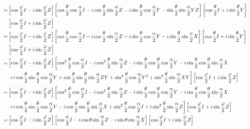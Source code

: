 \documentclass[en]{sol-man}
\begin{document}
\begin{pf}
\begin{align}
        \notag=&\left[\cos\frac{\varphi}{2}I-i\sin\frac{\varphi}{2}Z\right]\left[\cos\frac{\theta}{2}\cos\frac{\alpha}{2}I-i\cos\frac{\theta}{2}\sin\frac{\alpha}{2}Z-i\sin\frac{\theta}{2}\cos\frac{\alpha}{2}Y-\sin\frac{\theta}{2}\sin\frac{\alpha}{2}YZ\right]\left[\cos\frac{\theta}{2}I+i\sin\frac{\theta}{2}Y\right]\\
        \notag&\left[\cos\frac{\varphi}{2}I+i\sin\frac{\varphi}{2}Z\right]\\
        \notag=&\left[\cos\frac{\varphi}{2}I-i\sin\frac{\varphi}{2}Z\right]\left[\cos\frac{\theta}{2}\cos\frac{\alpha}{2}I-i\cos\frac{\theta}{2}\sin\frac{\alpha}{2}Z-i\sin\frac{\theta}{2}\cos\frac{\alpha}{2}Y-i\sin\frac{\theta}{2}\sin\frac{\alpha}{2}X\right]\left[\cos\frac{\theta}{2}I+i\sin\frac{\theta}{2}Y\right]\\
        \notag&\left[\cos\frac{\varphi}{2}I+i\sin\frac{\varphi}{2}Z\right]\\
        \notag=&\left[\cos\frac{\varphi}{2}I-i\sin\frac{\varphi}{2}Z\right]\left[\cos^2\frac{\theta}{2}\cos\frac{\alpha}{2}I-i\cos^2\frac{\theta}{2}\sin\frac{\alpha}{2}Z-i\sin\frac{\theta}{2}\cos\frac{\theta}{2}\cos\frac{\alpha}{2}Y-i\sin\frac{\theta}{2}\cos\frac{\theta}{2}\sin\frac{\alpha}{2}X\right.\\
        &\left.+i\cos\frac{\theta}{2}\sin\frac{\theta}{2}\cos\frac{\alpha}{2}Y+\cos\frac{\theta}{2}\sin\frac{\theta}{2}\sin\frac{\alpha}{2}ZY+\sin^2\frac{\theta}{2}\cos\frac{\alpha}{2}Y^2+\sin^2\frac{\theta}{2}\sin\frac{\alpha}{2}XY\right]\left[\cos\frac{\varphi}{2}I+i\sin\frac{\varphi}{2}Z\right]\\
        \notag=&\left[\cos\frac{\varphi}{2}I-i\sin\frac{\varphi}{2}Z\right]\left[\cos^2\frac{\theta}{2}\cos\frac{\alpha}{2}I-i\cos^2\frac{\theta}{2}\sin\frac{\alpha}{2}Z-i\sin\frac{\theta}{2}\cos\frac{\theta}{2}\cos\frac{\alpha}{2}Y-i\sin\frac{\theta}{2}\cos\frac{\theta}{2}\sin\frac{\alpha}{2}X\right.\\
        \notag&\left.+i\cos\frac{\theta}{2}\sin\frac{\theta}{2}\cos\frac{\alpha}{2}Y-i\cos\frac{\theta}{2}\sin\frac{\theta}{2}\sin\frac{\alpha}{2}X+\sin^2\frac{\theta}{2}\cos\frac{\alpha}{2}I+i\sin^2\frac{\theta}{2}\sin\frac{\alpha}{2}Z\right]\left[\cos\frac{\varphi}{2}I+i\sin\frac{\varphi}{2}Z\right]\\
        \notag=&\left[\cos\frac{\varphi}{2}I-i\sin\frac{\varphi}{2}Z\right]\left[\cos\frac{\alpha}{2}I-i\cos\theta\sin\frac{\alpha}{2}Z-i\sin\theta\sin\frac{\alpha}{2}X\right]\left[\cos\frac{\varphi}{2}I+i\sin\frac{\varphi}{2}Z\right]\\

\end{align}
\end{pf}
\end{document}
